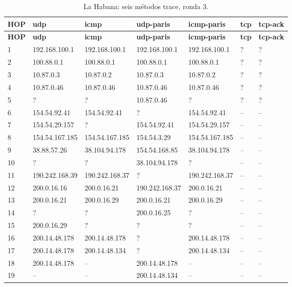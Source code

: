 \begin{longtable}{p{0.8cm}p{2.25cm}p{2.25cm}p{2.25cm}p{2.25cm}p{2.25cm}p{2.25cm}}
\caption{La Habana: seis métodos trace, ronda 3.}\label{anexo:trace:200.14.48.134:3} \\
\toprule
\textbf{HOP} & \textbf{udp} & \textbf{icmp} & \textbf{udp-paris} & \textbf{icmp-paris} & \textbf{tcp} & \textbf{tcp-ack} \\ \midrule
\endfirsthead
\toprule
\textbf{HOP} & \textbf{udp} & \textbf{icmp} & \textbf{udp-paris} & \textbf{icmp-paris} & \textbf{tcp} & \textbf{tcp-ack} \\ \midrule
\endhead
1 & 192.168.100.1 & 192.168.100.1 & 192.168.100.1 & 192.168.100.1 & ? & ? \\
2 & 100.88.0.1 & 100.88.0.1 & 100.88.0.1 & 100.88.0.1 & ? & ? \\
3 & 10.87.0.3 & 10.87.0.2 & 10.87.0.3 & 10.87.0.2 & ? & ? \\
4 & 10.87.0.46 & 10.87.0.46 & 10.87.0.46 & 10.87.0.46 & ? & ? \\
5 & ? & ? & 10.87.0.46 & ? & ? & ? \\
6 & 154.54.92.41 & 154.54.92.41 & ? & 154.54.92.41 & -- & -- \\
7 & 154.54.29.157 & ? & 154.54.92.41 & 154.54.29.157 & -- & -- \\
8 & 154.54.167.185 & 154.54.167.185 & 154.54.3.29 & 154.54.167.185 & -- & -- \\
9 & 38.88.57.26 & 38.104.94.178 & 154.54.168.85 & 38.104.94.178 & -- & -- \\
10 & ? & ? & 38.104.94.178 & ? & -- & -- \\
11 & 190.242.168.39 & 190.242.168.37 & ? & 190.242.168.37 & -- & -- \\
12 & 200.0.16.16 & 200.0.16.21 & 190.242.168.37 & 200.0.16.21 & -- & -- \\
13 & 200.0.16.21 & 200.0.16.29 & 200.0.16.21 & 200.0.16.29 & -- & -- \\
14 & ? & ? & 200.0.16.25 & ? & -- & -- \\
15 & 200.0.16.29 & ? & ? & ? & -- & -- \\
16 & 200.14.48.178 & 200.14.48.178 & ? & 200.14.48.178 & -- & -- \\
17 & 200.14.48.178 & 200.14.48.134 & ? & 200.14.48.134 & -- & -- \\
18 & 200.14.48.178 & -- & 200.14.48.178 & -- & -- & -- \\
19 & -- & -- & 200.14.48.134 & -- & -- & -- \\
\bottomrule
\end{longtable}

